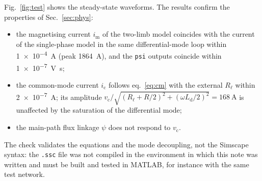\documentclass[11pt,a4paper]{article}
\begin{document}
Fig.~\ref{fig:test} shows the steady-state waveforms. The results confirm the properties
of Sec.~\ref{sec:phys}:
\begin{itemize}
  \item the magnetising current $i_\mathrm{m}$ of the two-limb model coincides with the
        current of the single-phase model in the same differential-mode loop within
        \num{1e-4}~\si{\ampere} (peak \SI{1864}{\ampere}), and the \texttt{psi} outputs
        coincide within \num{1e-7}~\si{\volt\second};
  \item the common-mode current $i_\mathrm{c}$ follows eq.~\eqref{eq:cm} with the
        external $R_\ell$ within \num{2e-7}~\si{\ampere}; its amplitude
        $v_\mathrm{c}/\sqrt{(R_\ell + R/2)^2 + (\omega L_\mathrm{d}/2)^2} = \SI{168}{\ampere}$
        is unaffected by the saturation of the differential mode;
  \item the main-path flux linkage $\psi$ does not respond to $v_\mathrm{c}$.
\end{itemize}
The check validates the equations and the mode decoupling, not the Simscape syntax: the
\texttt{.ssc} file was not compiled in the environment in which this note was written
and must be built and tested in MATLAB, for instance with the same test network.
\end{document}
